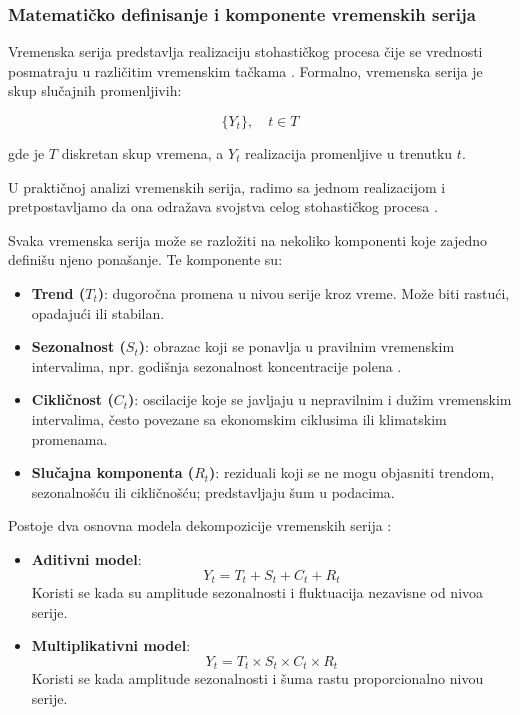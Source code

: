 \documentclass[12pt]{article}
\begin{document}
\subsubsection{Matematičko definisanje i komponente vremenskih serija}

Vremenska serija predstavlja realizaciju stohastičkog procesa čije se vrednosti posmatraju u različitim vremenskim tačkama \cite{yule1927, box1970}. Formalno, vremenska serija je skup slučajnih promenljivih:

\[
\{Y_t\}, \quad t \in T
\]

gde je $T$ diskretan skup vremena, a $Y_t$ realizacija promenljive u trenutku $t$.

U praktičnoj analizi vremenskih serija, radimo sa jednom realizacijom i pretpostavljamo da ona odražava svojstva celog stohastičkog procesa \cite{slutsky1937}.

Svaka vremenska serija može se razložiti na nekoliko komponenti koje zajedno definišu njeno ponašanje. Te komponente su:

\begin{itemize}
    \item \textbf{Trend ($T_t$)}: dugoročna promena u nivou serije kroz vreme. Može biti rastući, opadajući ili stabilan.
    
    \item \textbf{Sezonalnost ($S_t$)}: obrazac koji se ponavlja u pravilnim vremenskim intervalima, npr. godišnja sezonalnost koncentracije polena \cite{sofia2023}.
    
    \item \textbf{Cikličnost ($C_t$)}: oscilacije koje se javljaju u nepravilnim i dužim vremenskim intervalima, često povezane sa ekonomskim ciklusima ili klimatskim promenama.
    
    \item \textbf{Slučajna komponenta ($R_t$)}: reziduali koji se ne mogu objasniti trendom, sezonalnošću ili cikličnošću; predstavljaju šum u podacima.
\end{itemize}

Postoje dva osnovna modela dekompozicije vremenskih serija \cite{yule1927, box1970}:

\begin{itemize}
    \item \textbf{Aditivni model}:
    \begin{equation*}
        Y_t = T_t + S_t + C_t + R_t
    \end{equation*}
    Koristi se kada su amplitude sezonalnosti i fluktuacija nezavisne od nivoa serije.
    
    \item \textbf{Multiplikativni model}:
    \begin{equation*}
        Y_t = T_t \times S_t \times C_t \times R_t
    \end{equation*}
    Koristi se kada amplitude sezonalnosti i šuma rastu proporcionalno nivou serije.
\end{itemize}
\end{document}
